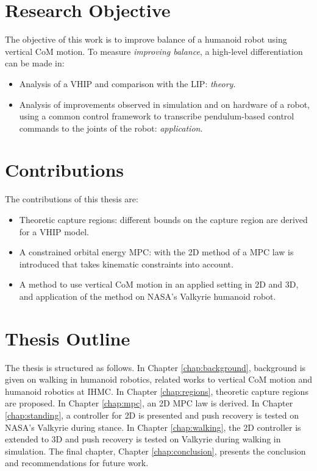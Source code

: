 \section{Research Objective}
The objective of this work is to improve balance of a humanoid robot using vertical \ac{CoM} motion. To measure \textit{improving balance}, a high-level differentiation can be made in:
\begin{itemize}
	\item Analysis of a \ac{VHIP} and comparison with the \ac{LIP}: \textit{theory}.
	\item Analysis of improvements observed in simulation and on hardware of a robot, using a common control framework to transcribe pendulum-based control commands to the joints of the robot: \textit{application}.
\end{itemize}

\section{Contributions}
The contributions of this thesis are:
\begin{itemize}
	\item Theoretic capture regions: different bounds on  the capture region are derived for a \ac{VHIP} model. 
      \item A constrained orbital energy \ac{MPC}: with the \ac{2D} method of \cite{koolen2016balance} a \ac{MPC} law is introduced that takes kinematic constraints into account.
	\item A method to use vertical \ac{CoM} motion in an applied setting in \ac{2D} and \ac{3D}, and application of the method on NASA's Valkyrie humanoid robot.
\end{itemize}
\section{Thesis Outline}
The thesis is structured as follows. In Chapter \ref{chap:background}, background is given on walking in humanoid robotics, related works to vertical \ac{CoM} motion and humanoid robotics at \ac{IHMC}. In Chapter \ref{chap:regions}, theoretic capture regions are proposed. In Chapter \ref{chap:mpc}, an \ac{2D} \ac{MPC} law is derived. In Chapter \ref{chap:standing}, a controller for \ac{2D} is presented and push recovery is tested on NASA's Valkyrie during stance. In Chapter \ref{chap:walking}, the \ac{2D} controller is extended to \ac{3D} and push recovery is tested on Valkyrie during walking in simulation. The final chapter, Chapter \ref{chap:conclusion}, presents the conclusion and recommendations for future work.

